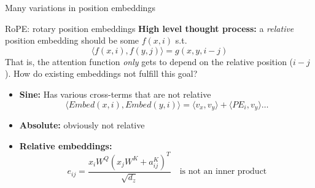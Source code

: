 \begin{frame}{Many variations in position embeddings}
\footnotesize
\renewcommand{\arraystretch}{1.2}
\end{frame}

\begin{frame}{RoPE: rotary position embeddings}
\small
\textbf{High level thought process:} a \emph{relative} position embedding should be some $f(x, i)$ s.t.
\[ \langle f(x, i), f(y, j) \rangle = g(x, y, i - j) \]
That is, the attention function \emph{only} gets to depend on the relative position ($i-j$). How do existing embeddings not fulfill this goal?
\begin{itemize}
  \item \textbf{Sine:} Has various cross-terms that are not relative
  \[ \langle \mathit{Embed}(x, i), \mathit{Embed}(y, i) \rangle = \langle v_x, v_y \rangle + \langle PE_i, v_y \rangle \ldots \]
  \item \textbf{Absolute:} obviously not relative
  \item \textbf{Relative embeddings:}
  \[ e_{ij} = \frac{x_i W^Q \left(x_j W^K + a_{ij}^K\right)^T}{\sqrt{d_z}} \quad \text{is not an inner product} \]
\end{itemize}
\end{frame}

